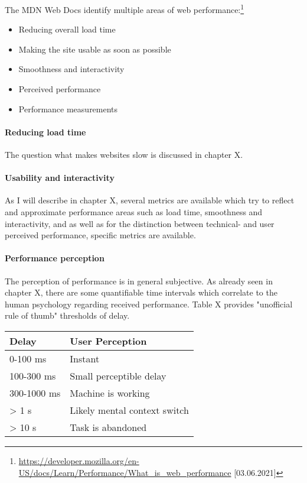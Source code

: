 The MDN Web Docs identify multiple areas of web performance:\footnote{\url{https://developer.mozilla.org/en-US/docs/Learn/Performance/What_is_web_performance} [03.06.2021]}
\begin{itemize}
\item Reducing overall load time
\item Making the site usable as soon as possible
\item Smoothness and interactivity
\item Perceived performance
\item Performance measurements
\end{itemize}

\paragraph{Reducing load time} The question what makes websites slow is discussed in chapter X.

\paragraph{Usability and interactivity} As I will describe in chapter X, several metrics are available which try to reflect and approximate performance areas such as load time, smoothness and interactivity, and as well as for the distinction between technical- and user perceived performance, specific metrics are available.


\paragraph{Performance perception}

The perception of performance is in general subjective.
As already seen in chapter X, there are some quantifiable time intervals which correlate to the human psychology regarding received performance.
Table X provides "unofficial rule of thumb" thresholds of delay. %

\begin{table}[h]
	\centering
	\begin{tabular}{| l | l | }
	\hline
	Delay & User Perception \\
	\hline
	0-100 ms & Instant \\
	100-300 ms & Small perceptible delay \\
	300-1000 ms & Machine is working \\
	> 1 s & Likely mental context switch \\
	> 10 s & Task is abandoned \\
	\hline
	\end{tabular}
\end{table}

